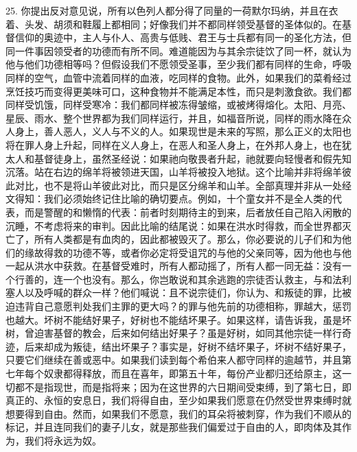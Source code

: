 25. 你提出反对意见说，所有以色列人都分得了同量的一荷默尔玛纳，并且在衣着、头发、胡须和鞋履上都相同；好像我们并不都同样领受基督的圣体似的。在基督信仰的奥迹中，主人与仆人、高贵与低贱、君王与士兵都有同一的圣化方法，但同一件事因领受者的功德而有所不同。难道能因为与其余宗徒饮了同一杯，就认为他与他们功德相等吗？但假设我们不愿领受圣事，至少我们都有同样的生命，呼吸同样的空气，血管中流着同样的血液，吃同样的食物。此外，如果我们的菜肴经过烹饪技巧而变得更美味可口，这种食物并不能满足本性，而只是刺激食欲。我们都同样受饥饿，同样受寒冷：我们都同样被冻得皱缩，或被烤得熔化。太阳、月亮、星辰、雨水、整个世界都为我们同样运行，并且，如福音所说，同样的雨水降在众人身上，善人恶人，义人与不义的人。如果现世是未来的写照，那么正义的太阳也将在罪人身上升起，同样在义人身上，在恶人和圣人身上，在外邦人身上，也在犹太人和基督徒身上，虽然圣经说：如果祂向敬畏者升起，祂就要向轻慢者和假先知沉落。站在右边的绵羊将被领进天国，山羊将被投入地狱。这个比喻并非将绵羊彼此对比，也不是将山羊彼此对比，而只是区分绵羊和山羊。全部真理并非从一处经文得知：我们必须始终记住比喻的确切要点。例如，十个童女并不是全人类的代表，而是警醒的和懒惰的代表：前者时刻期待主的到来，后者放任自己陷入闲散的沉睡，不考虑将来的审判。因此比喻的结尾说：如果在洪水时得救，而全世界都灭亡了，所有人类都是有血肉的，因此都被毁灭了。那么，你必要说的儿子们和为他们的缘故得救的功德不等，或者你必定将受诅咒的与他的父亲同等，因为他也与他一起从洪水中获救。在基督受难时，所有人都动摇了，所有人都一同无益：没有一个行善的，连一个也没有。那么，你岂敢说和其余逃跑的宗徒否认救主，与和法利塞人以及呼喊的群众一样？他们喊说：且不说宗徒们，你认为、和叛徒的罪，比被迫违背自己意愿判处我们主罪的更大吗？的罪与他先前的功德相称，罪越大，惩罚也越大。坏树不能结好果子，好树也不能结坏果子。如果这样，请告诉我，虽是坏树，曾迫害基督的教会，后来如何结出好果子？虽是好树，如同其他宗徒一样行奇迹，后来却成为叛徒，结出坏果子？事实是，好树不结坏果子，坏树不结好果子，只要它们继续在善或恶中。如果我们读到每个希伯来人都守同样的逾越节，并且第七年每个奴隶都得释放，而且在喜年，即第五十年，每份产业都归还给原主，这一切都不是指现世，而是指将来；因为在这世界的六日期间受束缚，到了第七日，即真正的、永恒的安息日，我们将得自由，至少如果我们愿意在仍然受世界束缚时就想要得到自由。然而，如果我们不愿意，我们的耳朵将被刺穿，作为我们不顺从的标记，并且连同我们的妻子儿女，就是那些我们偏爱过于自由的人，即肉体及其作为，我们将永远为奴。\par

